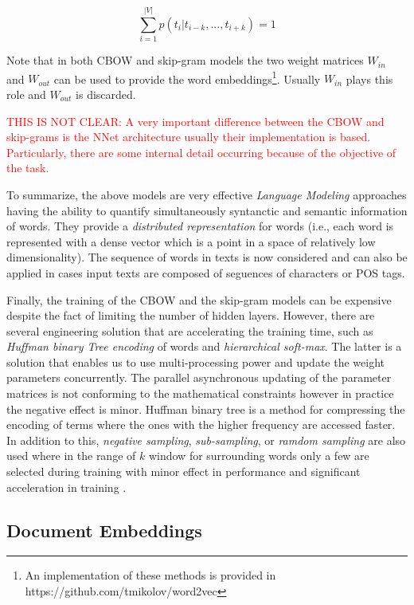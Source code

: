 \begin{equation} \label{chap:word_embeddings:eq:nnet_condtraint}
	\sum_{i=1}^{|V|}{p(t_{i}|t_{i-k}, ... ,t_{i+k})} = 1
\end{equation}

Note that in both CBOW and skip-gram models the two weight matrices $W_{in}$ and $W_{out}$ can be used to provide the word embeddings\footnote{An implementation of these methods is provided in https://github.com/tmikolov/word2vec}. Usually $W_{in}$ plays this role and $W_{out}$ is discarded.

\textcolor{red}{THIS IS NOT CLEAR: A very important difference between the CBOW and skip-grams is the NNet architecture usually their implementation is based. Particularly, there are some internal detail occurring because of the objective of the task. \parencite{boden2002guide}}

To summarize, the above models are very effective \textit{Language Modeling} approaches having the ability to quantify simultaneously syntanctic and semantic information of words. They provide a \textit{distributed representation} for words (i.e., each word is represented with a dense vector which is a point in a space of relatively low dimensionality). The sequence of words in texts is now considered and can also be applied in cases input texts are composed of seguences of characters or POS tags.

Finally, the training of the CBOW and the skip-gram models can be expensive despite the fact of limiting the number of hidden layers. However, there are several engineering solution that are accelerating the training time, such as \textit{Huffman binary Tree encoding} of words and \textit{hierarchical soft-max}. The latter is a solution that enables us to use multi-processing power and update the weight parameters concurrently. The parallel asynchronous updating of the parameter matrices is not conforming to the mathematical constraints however in practice the negative effect is minor. Huffman binary tree is a method for compressing the encoding of terms where the ones with the higher frequency are accessed faster. In addition to this, \textit{negative sampling}, \textit{sub-sampling}, or \textit{ramdom sampling} are also used where in the range of $k$ window for surrounding words only a few are selected during training with minor effect in  performance and significant acceleration in training . 

\subsection{Document Embeddings} \label{chap:word_embeddings:sec:PVBOW} 
 
